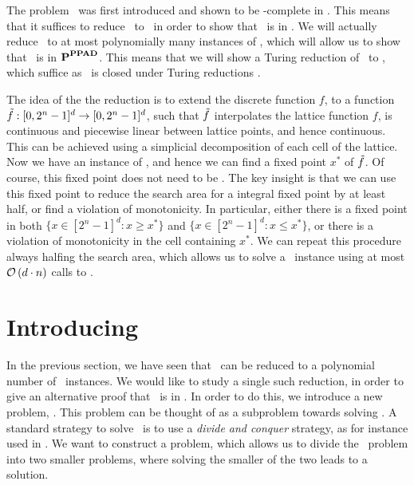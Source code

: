 The problem \Brouwer\ was first introduced and shown to be \PPAD-complete in . This means that it suffices to reduce \Tarski\ to \Brouwer\ in order to show that \Tarski\ is in \PPAD. We will actually reduce \Tarski\ to at most polynomially many instances of \Brouwer, which will allow us to show that \Tarski\ is in $\textbf{P}^{\textbf{PPAD}}$. This means that we will show a Turing reduction of \Tarski\ to \Brouwer, which suffice as \PPAD\ is closed under Turing reductions .

The idea of the the reduction is to extend the discrete function $f$, to a function $\Tilde{f} : [0, 2^n - 1]^d \rightarrow [0, 2^n - 1]^d$, such that $\Tilde{f}$ interpolates the lattice function $f$, is continuous and piecewise linear between lattice points, and hence continuous. This can be achieved using a simplicial decomposition of each cell of the lattice. Now we have an instance of \Brouwer, and hence we can find a fixed point $x^*$ of $\Tilde{f}$. Of course, this fixed point does not need to be 
.
The key insight is that we can use this fixed point to reduce the search area for a integral fixed point by at least half, or find a violation of monotonicity. In particular, either there is a fixed point in both $\{x \in [2^n-1]^d : x \geq x^*\}$ and $\{x \in [2^n-1]^d : x \leq x^*\}$, or there is a violation of monotonicity in the cell containing $x^*$.
We can repeat this procedure always halfing the search area, which allows us to solve a \Tarski\ instance using at most $\mathcal{O}\left(d \cdot n\right)$ calls to \Brouwer. 

\section{Introducing \Tarskistar}

In the previous section, we have seen that \Tarski\ can be reduced to a polynomial number of \Brouwer\ instances. We would like to study a single such reduction, in order to give an alternative proof that \Tarski\ is in \PPAD. In order to do this, we introduce a new problem, \Tarskistar. This problem can be thought of as a subproblem towards solving \Tarski. A standard strategy to solve \Tarski\ is to use a \emph{divide and conquer} strategy, as for instance used in . We want to construct a problem, which allows us to divide the \Tarski\ problem into two smaller problems, where solving the smaller of the two leads to a solution.

